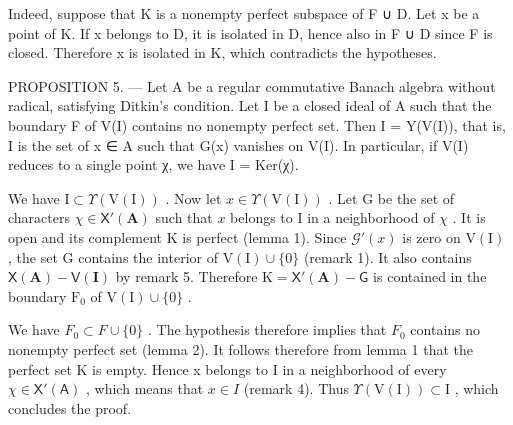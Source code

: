 Indeed, suppose that K is a nonempty perfect subspace of F ∪ D. Let x be a point of K. If x belongs to D, it is isolated in D, hence also in F ∪ D since F is closed. Therefore x is isolated in K, which contradicts the hypotheses.

PROPOSITION 5. — Let A be a regular commutative Banach algebra without radical, satisfying Ditkin's condition. Let I be a closed ideal of A such that the boundary F of V(I) contains no nonempty perfect set. Then I = Y(V(I)), that is, I is the set of x ∈ A such that G(x) vanishes on V(I). In particular, if V(I) reduces to a single point χ, we have I = Ker(χ).

We have \(\mathrm{I} \subset \Upsilon(\mathrm{V}(\mathrm{I}))\) . Now let \(x \in \Upsilon(\mathrm{V}(\mathrm{I}))\) . Let \(\mathrm{G}\) be the set of characters \(\chi \in \mathsf{X}'(\mathbf{A})\) such that \(x\) belongs to \(\mathrm{I}\) in a neighborhood of \(\chi\) . It is open and its complement \(\mathrm{K}\) is perfect (lemma 1). Since \(\mathcal{G}'(x)\) is zero on \(\mathrm{V}(\mathrm{I})\) , the set \(\mathrm{G}\) contains the interior of \(\mathrm{V}(\mathrm{I}) \cup \{0\}\) (remark 1). It also contains \(\mathsf{X}(\mathbf{A}) - \mathsf{V}(\mathbf{I})\) by remark 5. Therefore \(\mathrm{K} = \mathsf{X}'(\mathbf{A}) - \mathsf{G}\) is contained in the boundary \(\mathrm{F}_0\) of \(\mathrm{V}(\mathrm{I}) \cup \{0\}\) .

We have \(F_{0} \subset F \cup \{0\}\) . The hypothesis therefore implies that \(F_{0}\) contains no nonempty perfect set (lemma 2). It follows therefore from lemma 1 that the perfect set K is empty. Hence x belongs to I in a neighborhood of every \(\chi \in \mathsf{X}'(\mathsf{A})\) , which means that \(x \in I\) (remark 4). Thus \(\Upsilon(\mathrm{V}(\mathrm{I})) \subset \mathrm{I}\) , which concludes the proof.

